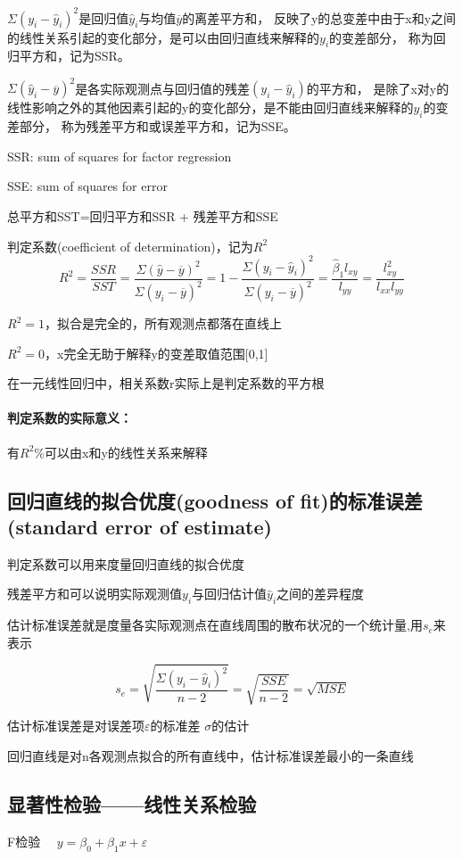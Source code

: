 \documentclass[UTF8,10pt]{book}
\begin{document}
{$\Sigma (y_i-\hat{y}_i)^2$是回归值$\hat{y}_i$与均值$\overline{y}$的离差平方和，
反映了y的总变差中由于x和y之间的线性关系引起的变化部分，是可以由回归直线来解释的$y_i$的变差部分，
称为回归平方和，记为SSR。

$\Sigma(\hat{y}_i-\overline{y})^2 $是各实际观测点与回归值的残差$(y_i-\hat{y}_i)$的平方和，
是除了x对y的线性影响之外的其他因素引起的y的变化部分，是不能由回归直线来解释的$y_i$的变差部分，
称为残差平方和或误差平方和，记为SSE。

SSR: sum of squares for factor regression

SSE: sum of squares for error 

总平方和SST=回归平方和SSR + 残差平方和SSE 

判定系数(coefficient of determination)，记为$R^2$ 
$$R^2 = \frac{SSR}{SST}=\frac{\Sigma(\hat{y}-\overline{y})^2}{\Sigma(y_i-\overline{y})^2} = 1 - \frac{\Sigma(y_i - \hat{y}_i)^2}{\Sigma(y_i-\overline{y})^2} = \frac{\hat{\beta}_1 l_{x y }}{l_{y y}} = \frac{l^2_{x y} }{l_{ x x } l_{y y}}$$ 

$R^2=1$，拟合是完全的，所有观测点都落在直线上

$R^2=0$，x完全无助于解释y的变差取值范围[0,1] 

在一元线性回归中，相关系数r实际上是判定系数的平方根 

\paragraph{判定系数的实际意义：}有$R^2\%$可以由x和y的线性关系来解释

\subsection{回归直线的拟合优度(goodness of fit)的标准误差(standard error of estimate)}	

判定系数可以用来度量回归直线的拟合优度 

残差平方和可以说明实际观测值$y_i$与回归估计值$\hat{y}_i$之间的差异程度 

估计标准误差就是度量各实际观测点在直线周围的散布状况的一个统计量,用$s_e$来表示 

$$ s_e = \sqrt{\frac{\Sigma (y_i - \hat{y}_i)^2}{n-2}} = \sqrt{\frac{SSE}{n-2}}=\sqrt{MSE} $$ 

估计标准误差是对误差项$\varepsilon$的标准差 $\sigma$的估计 

回归直线是对n各观测点拟合的所有直线中，估计标准误差最小的一条直线

\subsection{显著性检验——线性关系检验}	
F检验
$\quad y = \beta_0 + \beta_1 x+ \varepsilon \quad $


}
\end{document}
